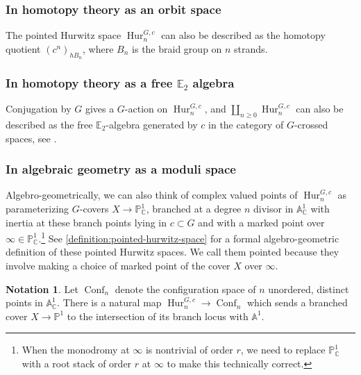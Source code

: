 \documentclass[12 pt]{amsart}
\theoremstyle{plain}
\theoremstyle{definition}
\newtheorem{notation}[theorem]{Notation}
\theoremstyle{remark}
\numberwithin{equation}{section}
\DeclareMathOperator\Hur{Hur}
\newcommand\EE{\mathbb{E}}
\DeclareMathOperator\conf{Conf}
\newcommand{\phurc}[3]{\operatorname{Hur}^{#1, #3}_{#2}}
\begin{document}
\subsubsection{In homotopy theory as an orbit space}
\label{subsubsection:hurwitz-quotient}
The pointed Hurwitz space $\Hur^{G,c}_n$ can also be described as the homotopy quotient 
$(c^n)_{hB_n}$, where $B_n$ is the braid
group on $n$ strands. 
\subsubsection{In homotopy theory as a free $\EE_2$ algebra}
\label{subsubsection:hurwitz-e2}
Conjugation by $G$ gives a $G$-action on $\Hur_n^{G,c}$, and
$\coprod_{n\geq0}\Hur_n^{G,c}$ can also be described as the free $\EE_2$-algebra
generated by $c$ in the category of $G$-crossed spaces, see \cite[Remark 6.4]{randal-williams:homology-of-hurwitz-spaces}.
\subsubsection{In algebraic geometry as a moduli space}
\label{subsubsection:hurwitz-ag}
Algebro-geometrically, we can also think of complex valued points of $\phurc G n
c$ as
parameterizing $G$-covers $X \to \mathbb P^1_{\mathbb C}$, branched at
a degree $n$ divisor in $\mathbb A^1_{\mathbb C}$ with inertia at these branch
points lying in $c \subset G$ and with a marked point over $\infty \in \mathbb
P^1_{\mathbb C}$.\footnote{When the monodromy at $\infty$ is nontrivial of order
	$r$, we need
to replace $\mathbb P^1_{\mathbb C}$ with a root stack of order $r$ at
$\infty$ to make this technically correct.}
See \autoref{definition:pointed-hurwitz-space} for a formal algebro-geometric
definition of these pointed Hurwitz spaces.
We call them pointed because they involve making a choice of marked point of the
cover $X$ over
$\infty$.

\begin{notation}
	\label{notation:configuration-space}
	Let $\conf_{n}$ denote the configuration space of $n$
unordered, distinct points in $\mathbb A^1_{\mathbb C}$.
There is a natural map $\phurc G n c \to \conf_{n}$ which
sends a branched cover $X \to \mathbb P^1$ to the intersection of its branch
locus with $\mathbb A^1$.
\end{notation}
\end{document}
